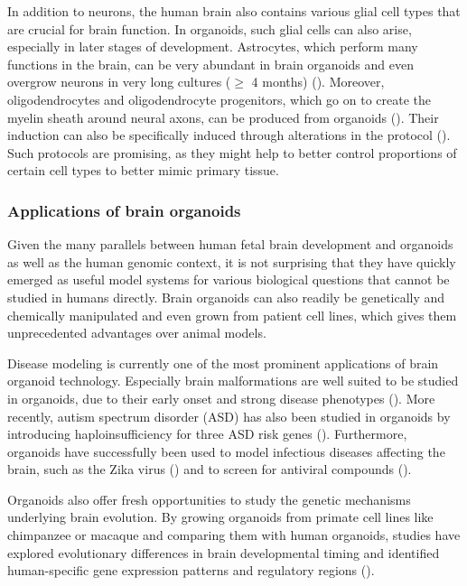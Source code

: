 In addition to neurons, the human brain also contains various glial cell types that are crucial for brain function. In organoids, such glial cells can also arise, especially in later stages of development. Astrocytes, which perform many functions in the brain, can be very abundant in brain organoids and even overgrow neurons in very long cultures ($\geq$ 4 months) (\cite{kanton_organoid_2019,giandomenico_cerebral_2019,sloan_human_2017}). Moreover, oligodendrocytes and oligodendrocyte progenitors, which go on to create the myelin sheath around neural axons, can be produced from organoids (\cite{tanaka_synthetic_2020}). Their induction can also be specifically induced through alterations in the protocol (\cite{madhavan_induction_2018,marton_differentiation_2019}). Such protocols are promising, as they might help to better control proportions of certain cell types to better mimic primary tissue.



\subsubsection{Applications of brain organoids}
Given the many parallels between human fetal brain development and organoids as well as the human genomic context, it is not surprising that they have quickly emerged as useful model systems for various biological questions that cannot be studied in humans directly. Brain organoids can also readily be genetically and chemically manipulated and even grown from patient cell lines, which gives them unprecedented advantages over animal models. 

Disease modeling is currently one of the most prominent applications of brain organoid technology. Especially brain malformations are well suited to be studied in organoids, due to their early onset and strong disease phenotypes (\cite{klaus_altered_2019,lancaster_cerebral_2013}). More recently, autism spectrum disorder (ASD) has also been studied in organoids by introducing haploinsufficiency for three ASD risk genes (\cite{paulsen_autism_2022}). Furthermore, organoids have successfully been used to model infectious diseases affecting the brain, such as the Zika virus (\cite{qian_brain-region-specific_2016,dang_zika_2016}) and to screen for antiviral compounds (\cite{zhou_high-content_2017}). 

Organoids also offer fresh opportunities to study the genetic mechanisms underlying brain evolution. By growing organoids from primate cell lines like chimpanzee or macaque and comparing them with human organoids, studies have explored evolutionary differences in brain developmental timing and identified human-specific gene expression patterns and regulatory regions (\cite{kanton_organoid_2019,mora-bermudez_differences_2016,pollen_establishing_2019}).

